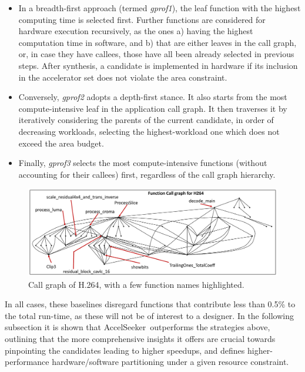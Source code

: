 \documentclass[]{usiinfthesis}
\newcommand{\aseeker}{{AccelSeeker}}
\begin{document}
\begin{itemize}
\item{} In a breadth-first approach (termed \emph{gprof1}), the leaf
  function with the highest computing time is selected first. Further
  functions are considered for hardware execution recursively, as the
  ones a) having the highest computation time in software, and b) that
  are either leaves in the call graph, or, in case they have callees,
  those have all been already selected in previous steps. After
  synthesis, a candidate is implemented in hardware if its inclusion
  in the accelerator set does not violate the area constraint.
\item{} Conversely, \emph{gprof2} adopts a depth-first stance. It also starts from
the most compute-intensive leaf in the application call graph. It then traverses it
by iteratively considering the parents of the current candidate, in order
of decreasing workloads, selecting the highest-workload one which does 
not exceed the area budget. 
\item{} Finally, \emph{gprof3} selects the most compute-intensive functions (without
accounting for their callees) first, regardless of the call graph hierarchy. 
\end{itemize}

\begin{figure}[t]
  \centering
  \includegraphics[width=1\linewidth]{figs/call_graph_w_no_names.pdf}
  \caption{Call graph of H.264, with a few function names
          highlighted.}
  \label{fig:call-graph-w-no-names}
\end{figure}

In all cases, these baselines disregard functions that contribute less
than 0.5\% to the total run-time, as these will not be of interest to
a designer. In the following subsection it is shown that \aseeker\ 
outperforms the strategies above, outlining that the more
comprehensive insights it offers are crucial towards pinpointing the
candidates leading to higher speedups, and defines
higher-performance hardware/software partitioning under a given resource
constraint.
\end{document}
